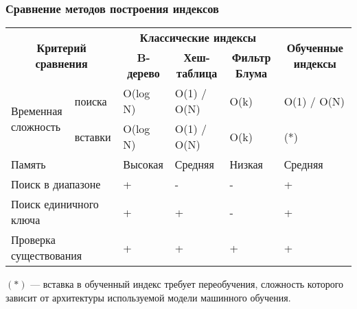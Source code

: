 \documentclass[8pt]{bmstu-pr}
\begin{document}
\begin{frame}
    \fontsize{22pt}{22pt}\selectfont
    \frametitle{Сравнение методов построения индексов}

{
\fontsize{20pt}{20pt}\selectfont
\renewcommand{\arraystretch}{1.5}
\begin{longtable}[Hc]{|p{4cm}|p{1.5cm}|p{3cm}|p{4cm}|p{2.5cm}|p{4cm}|}
    \hline
    \multicolumn{2}{|c|}{\multirow{2}{*}{\textbf{Критерий сравнения}}} &
    \multicolumn{3}{|c|}{\textbf{Классические индексы}} &
    \multicolumn{1}{c|}{\multirow{2}{*}{\parbox{4cm}{
        \centering\textbf{Обученные индексы}}}}\\
    \cline{3-5}
    \multicolumn{2}{|c|}{} & \multicolumn{1}{c|}{\textbf{B-дерево}} &
    \multicolumn{1}{c|}{\textbf{Хеш-таблица}} &
    \multicolumn{1}{c|}{\parbox{2.5cm}{\centering\textbf{Фильтр Блума}}} & \\
    \hline
    \multirow{2}{*}{\parbox{3cm}{Временная\\сложность}} &
    поиска & O(log N) & O(1) / O(N) & O(k) & O(1) / O(N)\\
    \cline{2-6}
    & вставки & O(log N) & O(1) / O(N) & O(k) & (*)\\
    \hline
    \multicolumn{2}{|l|}{Память} & Высокая & Средняя & Низкая & Средняя\\
    \hline
    \multicolumn{2}{|l|}{Поиск в диапазоне} & + & - & - & + \\
    \hline
    \multicolumn{2}{|l|}{Поиск единичного ключа} & + & + & - & + \\
    \hline
    \multicolumn{2}{|l|}{Проверка существования} & + & + & + & + \\
    \hline
\end{longtable}
}

$(*)$ --- вставка в обученный индекс требует переобучения, сложность которого
зависит от архитектуры используемой модели машинного обучения.
\end{frame}

\end{document}
